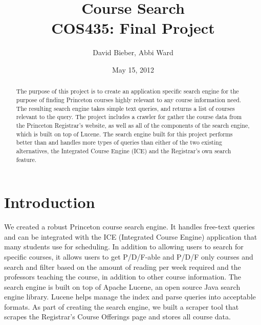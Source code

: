 \documentclass[12pt,letterpaper]{article}
\begin{document}
\title{Course Search \\ \large{COS435: Final Project}}
\author{David Bieber, Abbi Ward}
\date{May 15, 2012}

\null  %
\nointerlineskip  %
\vfill
\let\snewpage \newpage
\let\newpage \relax
\maketitle
\let \newpage \snewpage
\vfill 
\break %

\newpage

\begin{abstract}
The purpose of this project is to create an application specific search engine for the purpose of finding Princeton courses highly relevant to any course information need.
The resulting search engine takes simple text queries, and returns a list of courses relevant to the query. The project includes a crawler for gather the course data from the Princeton Registrar's website, as well as all of the components of the search engine, which is built on top of Lucene.
The search engine built for this project performs better than and handles more types of queries than either of the two existing alternatives, the Integrated Course Engine (ICE) and the Registrar's own search feature.
\end{abstract}

\section{Introduction}
We created a robust Princeton course search engine. It handles free-text queries and can be integrated with the ICE (Integrated Course Engine) application that many students use for scheduling.
In addition to allowing users to search for specific courses, it allows users to get P/D/F-able and P/D/F only courses and search and filter based on the amount of reading per week required and the professors teaching the course, in addition to other course information.
The search engine is built on top of Apache Lucene, an open source Java search engine library. Lucene helps manage the index and parse queries into acceptable formats.
As part of creating the search engine, we built a scraper tool that scrapes the Registrar's Course Offerings page and stores all course data.
\end{document}
